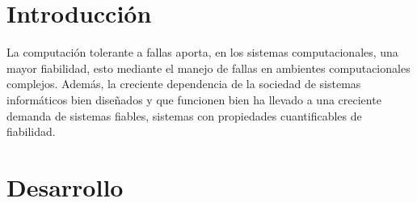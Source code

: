 \documentclass{dense_template}
\begin{document}
\maketitle
\tableofcontents
\newpage
\section{Introducción}
La computación tolerante a fallas aporta, en los sistemas computacionales, una mayor fiabilidad, esto mediante el manejo de fallas en ambientes computacionales complejos. Además, la creciente dependencia de la sociedad de sistemas informáticos bien diseñados y que funcionen bien ha llevado a una creciente demanda de sistemas fiables, sistemas con propiedades cuantificables de fiabilidad.
\section{Desarrollo}
\end{document}
